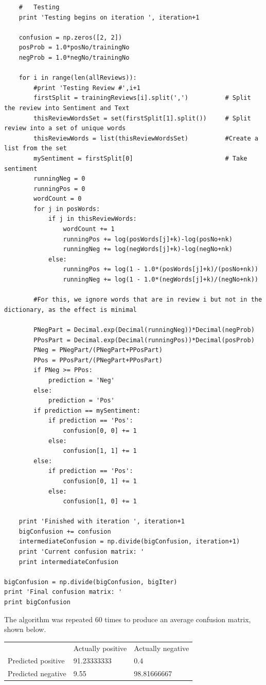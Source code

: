 \documentclass[10pt]{article}
\begin{document}
\begin{lstlisting}
    #   Testing
    print 'Testing begins on iteration ', iteration+1

    confusion = np.zeros([2, 2])
    posProb = 1.0*posNo/trainingNo
    negProb = 1.0*negNo/trainingNo

    for i in range(len(allReviews)):
        #print 'Testing Review #',i+1
        firstSplit = trainingReviews[i].split(',')          # Split the review into Sentiment and Text
        thisReviewWordsSet = set(firstSplit[1].split())     # Split review into a set of unique words
        thisReviewWords = list(thisReviewWordsSet)          #Create a list from the set
        mySentiment = firstSplit[0]                         # Take sentiment
        runningNeg = 0
        runningPos = 0
        wordCount = 0
        for j in posWords:
            if j in thisReviewWords:
                wordCount += 1
                runningPos += log(posWords[j]+k)-log(posNo+nk)
                runningNeg += log(negWords[j]+k)-log(negNo+nk)
            else:
                runningPos += log(1 - 1.0*(posWords[j]+k)/(posNo+nk))
                runningNeg += log(1 - 1.0*(negWords[j]+k)/(negNo+nk))

        #For this, we ignore words that are in review i but not in the dictionary, as the effect is minimal

        PNegPart = Decimal.exp(Decimal(runningNeg))*Decimal(negProb)
        PPosPart = Decimal.exp(Decimal(runningPos))*Decimal(posProb)
        PNeg = PNegPart/(PNegPart+PPosPart)
        PPos = PPosPart/(PNegPart+PPosPart)
        if PNeg >= PPos:
            prediction = 'Neg'
        else:
            prediction = 'Pos'
        if prediction == mySentiment:
            if prediction == 'Pos':
                confusion[0, 0] += 1
            else:
                confusion[1, 1] += 1
        else:
            if prediction == 'Pos':
                confusion[0, 1] += 1
            else:
                confusion[1, 0] += 1

    print 'Finished with iteration ', iteration+1
    bigConfusion += confusion
    intermediateConfusion = np.divide(bigConfusion, iteration+1)
    print 'Current confusion matrix: '
    print intermediateConfusion

bigConfusion = np.divide(bigConfusion, bigIter)
print 'Final confusion matrix: '
print bigConfusion
\end{lstlisting}
\newpage
The algorithm was repeated 60 times to produce an average confusion matrix, shown below.
\begin{table}[h]
\centering
\begin{tabular}{lll}
                   & Actually positive & Actually negative \\
Predicted positive & 91.23333333             & 0.4 \\
Predicted negative & 9.55             & 98.81666667            
\end{tabular}
\end{table}\\
\end{document}
